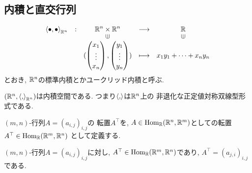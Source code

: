 \subsection{内積と直交行列}
\begin{align*}
  \shazo{\Braket{\bullet,\bullet}_{\RR^n}}
        {\RR^n \times \RR^n}{\RR}
        {(\begin{pmatrix}x_1\\\vdots\\x_n\end{pmatrix},\begin{pmatrix}y_1\\\vdots\\y_n\end{pmatrix})}
        {x_1y_1+\cdots+x_ny_n}
\end{align*}
とおき,
$\mathbb{R}^n$の標準内積とかユークリッド内積と呼ぶ.
\begin{prop}
  $(\mathbb{R}^n,\Braket{,}_{\mathbb{R}^n})$は内積空間である.
  つまり$\Braket{,}$は$\mathbb{R}^n$上の
  非退化な正定値対称双線型形式である.
\end{prop}
\begin{definition}
  $(m,n)$-行列$A=(a_{i,j})_{i,j}$の
  転置$A^\top$を,
  $A\in\operatorname{Hom}_{\mathbb{R}}(\mathbb{R}^n,\mathbb{R}^m)$としての転置$A^\top\in\operatorname{Hom}_{\mathbb{R}}(\mathbb{R}^m,\mathbb{R}^n)$
  として定義する.
\end{definition}
\begin{prop}
  $(m,n)$-行列$A=(a_{i,j})_{i,j}$に対し,
  $A^\top\in \operatorname{Hom}_{\mathbb{R}}(\mathbb{R}^m,\mathbb{R}^n)$であり,
  $A^\top=(a_{j,i})_{i,j}$である.
\end{prop}
